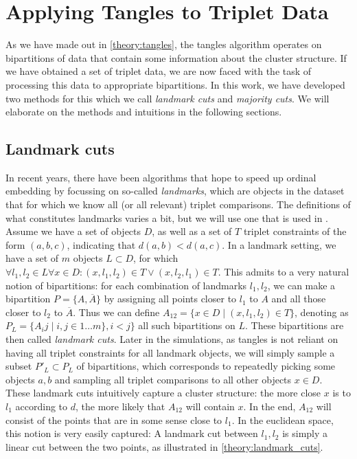 \chapter{Applying Tangles to Triplet Data}\label{methods}
As we have made out in \autoref{theory:tangles}, the tangles algorithm operates on bipartitions of data that contain some information about the cluster structure.
If we have obtained a set of triplet data, we are now faced with the task of processing this data to appropriate bipartitions. In this work, we have developed two
methods for this which we call \textit{landmark cuts} and \textit{majority cuts}. We will elaborate on the methods and intuitions in the following sections.

\section{Landmark cuts}\label{theory:landmark_cuts}
In recent years, there have been algorithms that hope to speed up ordinal embedding by focussing on so-called \textit{landmarks}\cite{ghoshLandmarkOrdinalEmbedding2019, andertonScalingOrdinalEmbedding2019}, which are objects in the dataset that for which we know all (or all relevant) triplet comparisons.
The definitions of what constitutes landmarks varies a bit, but we will use one that is used in \cite{haghiriComparisonBasedFrameworkPsychophysics2019}.
Assume we have a set of objects $D$, as well as a set of $T$ triplet constraints of the form $(a,b,c)$, indicating that $d(a,b) < d(a,c)$. In a landmark setting, we have a set 
of $m$ objects $L \subset D$, for which $\forall l_1, l_2 \in L \forall x \in D: (x, l_1, l_2) \in T \vee (x, l_2, l_1) \in T$. This admits to a very natural notion of bipartitions: 
for each combination of landmarks $l_1, l_2$, we can make a bipartition $P = \{A, \overline{A}\}$ by assigning all points closer to $l_1$ to $A$ and all 
those closer to $l_2$ to $\overline{A}$. Thus we can define $A_{12} = \{ x \in D \mid \left( x, l_1, l_2 \right) \in T \}$, denoting as $P_L = \{A_ij  \mid i, j \in 1\ldots m\}, i < j\}$ 
all such bipartitions on $L$. These bipartitions are then called \textit{landmark cuts}.
Later in the simulations, as tangles is not reliant on having all triplet constraints for all landmark objects, we will simply sample a subset $P'_{L} \subset P_L$ of bipartitions,
which corresponds to repeatedly picking some objects $a, b$ and sampling all triplet comparisons to all other objects $x \in D$. \\

These landmark cuts intuitively capture a cluster structure: the more close $x$ is to $l_1$ according to $d$, the more likely that $A_{12}$ will contain $x$. In the end, $A_{12}$ will
consist of the points that are in some sense close to $l_1$. In the euclidean space, this notion is very easily captured: A landmark cut between $l_1, l_2$ is
simply a linear cut between the two points, as illustrated in \autoref{theory:landmark_cuts}.

